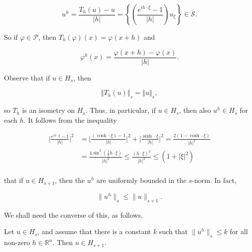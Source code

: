 \begin{equation}
\tag{2}\label{eq:6.19:2}
u^{h}=\frac{T_{h}(u)-u}{|h|}=\left\{\left(\frac{e^{i h\cdot\xi}-1}{|h|}\right)u_{\xi}\right\}\in\mathcal{S}.
\end{equation}

So if  $ \varphi \in \mathcal{P} $, then  $ T_{h}(\varphi)(x) = \varphi(x + h) $ and

\[
\varphi^{h}(x)=\frac{\varphi(x+h)-\varphi(x)}{|h|}.
\]

Observe that if  $ u \in H_{s} $, then

\begin{equation}
\tag{3}\label{eq:6.19:3}
\left\Vert T_{h}(u)\right\Vert_{s}=\left\Vert u\right\Vert_{s},
\end{equation}

so $T_h$ is an isometry on $H_s$. Thus, in particular, if $u \in H_s$, then also $u^h \in H_s$ for each $h$. It follows from the inequality

\begin{equation}
\tag{4}\label{eq:6.19:4}
\begin{aligned}{\bigg|\frac{e^{i h\cdot\xi}-1}{|h|}\bigg|^{2}}&{{}=\bigg|\frac{(\cosh\cdot\xi)-1}{|h|}\bigg|^{2}+\bigg|\frac{\sinh\cdot\xi}{|h|}\bigg|^{2}=\frac{2(1-\cosh\cdot\xi)}{|h|^{2}}}\\ {}&{{}=\frac{4\sin^{2}(\frac{1}{2}h\cdot\xi)}{|h|^{2}}\leq\frac{(h\cdot\xi)^{2}}{|h|^{2}}\leq(1+|\xi|^{2})}\\ \end{aligned}
\end{equation}

that if  $ u \in H_{s+1} $, then the  $ u^h $ are uniformly bounded in the  $ s $-norm. In fact,

\begin{equation}
\tag{5}\label{eq:6.19:5}
\|u^{h}\|_{s}\leq\|u\|_{s+1}.
\end{equation}

We shall need the converse of this, as follows.

\begin{lemma}\label{thm:6.20}
Let  $ u \in H_s $, and assume that there is a constant  $ k $ such that  $ \|u^h\|_s \leq k $ for all non-zero  $ h \in \mathbb{R}^n $. Then  $ u \in H_{s+1} $.

\end{lemma}


